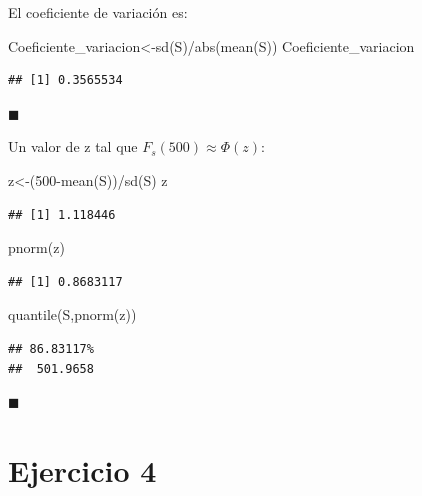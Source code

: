 \documentclass[
]{article}
\newenvironment{Shaded}{\begin{snugshade}}{\end{snugshade}}
\newcommand{\DecValTok}[1]{\textcolor[rgb]{0.00,0.00,0.81}{#1}}
\newcommand{\FunctionTok}[1]{\textcolor[rgb]{0.00,0.00,0.00}{#1}}
\newcommand{\NormalTok}[1]{#1}
\newcommand{\OtherTok}[1]{\textcolor[rgb]{0.56,0.35,0.01}{#1}}
\newcommand{\SpecialCharTok}[1]{\textcolor[rgb]{0.00,0.00,0.00}{#1}}
\begin{document}
El coeficiente de variación es:

\begin{Shaded}
\begin{Highlighting}[]
\NormalTok{Coeficiente\_variacion}\OtherTok{\textless{}{-}}\FunctionTok{sd}\NormalTok{(S)}\SpecialCharTok{/}\FunctionTok{abs}\NormalTok{(}\FunctionTok{mean}\NormalTok{(S))}
\NormalTok{Coeficiente\_variacion}
\end{Highlighting}
\end{Shaded}

\begin{verbatim}
## [1] 0.3565534
\end{verbatim}

\(\blacksquare\)

Un valor de z tal que \(F_s(500)\approx \Phi (z)\):

\begin{Shaded}
\begin{Highlighting}[]
\NormalTok{z}\OtherTok{\textless{}{-}}\NormalTok{(}\DecValTok{500}\SpecialCharTok{{-}}\FunctionTok{mean}\NormalTok{(S))}\SpecialCharTok{/}\FunctionTok{sd}\NormalTok{(S)}
\NormalTok{z}
\end{Highlighting}
\end{Shaded}

\begin{verbatim}
## [1] 1.118446
\end{verbatim}

\begin{Shaded}
\begin{Highlighting}[]
\FunctionTok{pnorm}\NormalTok{(z)}
\end{Highlighting}
\end{Shaded}

\begin{verbatim}
## [1] 0.8683117
\end{verbatim}

\begin{Shaded}
\begin{Highlighting}[]
\FunctionTok{quantile}\NormalTok{(S,}\FunctionTok{pnorm}\NormalTok{(z))}
\end{Highlighting}
\end{Shaded}

\begin{verbatim}
## 86.83117% 
##  501.9658
\end{verbatim}

\(\blacksquare\)

\hypertarget{ejercicio-4}{%
\section{Ejercicio 4}\label{ejercicio-4}}
\end{document}

